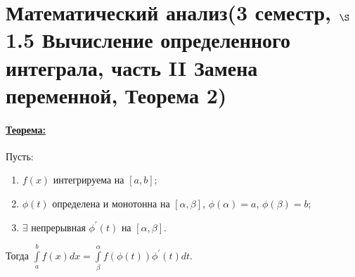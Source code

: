 \documentclass{article}
\begin{document}
	\section{Математический анализ(3 семестр, $\S$1.5 Вычисление определенного интеграла, часть II Замена переменной, Теорема 2)}

	\paragraph{\underline{Теорема:}}
		Пусть:
		\begin{enumerate}
			\item $f(x)$ интегрируема на $[a,b]$;
			\item $\phi(t)$ определена и монотонна на $[\alpha,\beta]$, $\phi(\alpha)=a$, $\phi(\beta)=b$;
			\item $\exists$ непрерывная $\phi^\prime(t)$ на $[\alpha,\beta]$.
		\end{enumerate}
		Тогда $\int\limits^b_a f(x)dx = \int\limits^\alpha_\beta f(\phi(t))\phi^\prime(t)dt$.
\end{document}
